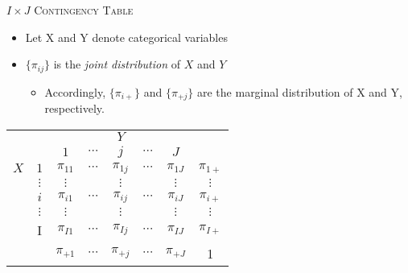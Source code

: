 \documentclass[dvipdfmx, serif,handout]{beamer}
\begin{document}
\begin{frame}{\textsc{$I \times J$ Contingency Table}}
\begin{itemize}
\item Let X and Y denote categorical variables
\item $\{\pi_{ij}\}$ is the {\it joint distribution} of $X$ and $Y$
\begin{itemize}
\item  Accordingly,  $\{\pi_{i+}\}$ and $\{\pi_{+j}\}$ are the marginal distribution of X and Y, respectively.
\end{itemize}
\end{itemize}

\centering
\begin{tabular}{cc|ccccc|c}
\hline
&		&\multicolumn{5}{c|}{$Y$}  & \\
&		&{$1$}  		&	{$\cdots$}		&	{$j$} 		&	{$\cdots$} &{$J$}  & \\\hline
$X$&$1$ 		& $\pi_{11}$ 	&	$\cdots$ 			&	$\pi_{1j}$ 	&	$\cdots$ 	&	$\pi_{1J}$&  $\pi_{1+}$ \\
&$\vdots$  	& $\vdots$ 	&		 		 	&	$\vdots$ 	&		 	&	$\vdots$&  $\vdots$ 	 \\
&{$i$} 		& {$\pi_{i1}$} 	&	{$\cdots$}	 	&	{$\pi_{ij}$} 	&	{$\cdots$}	&	{$\pi_{iJ}$}&  $\pi_{i+}$ \\
&$\vdots$ 	& $\vdots$ 	&		 		 	&	$\vdots$ 	&		 	&	$\vdots$&  $\vdots$ 	 \\
&I 		& $\pi_{I1}$ 	&	$\cdots$ 			&	$\pi_{Ij}$ 	&	$\cdots$ 	&	$\pi_{IJ}$&  $\pi_{I+}$ \\\hline
&		& $\pi_{+1}$ 	&	$\cdots$ 			&	$\pi_{+j}$ 	&	$\cdots$ 	&	$\pi_{+J}$&  1\\
\end{tabular}
\end{frame}
\end{document}
